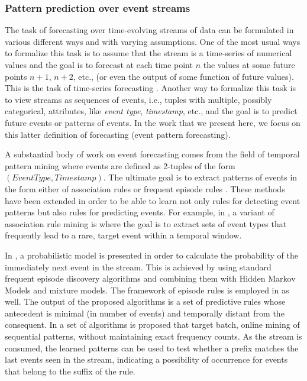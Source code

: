 

\subsubsection*{Pattern prediction over event streams}

\par The task of forecasting over time-evolving streams of data can be formulated in various different ways and with varying assumptions.
One of the most usual ways to formalize this task is to assume that the stream is a time-series of numerical values and the goal is to forecast at each time point $n$ the values at some future points $n+1$, $n+2$, etc., (or even the output of some function of future values). 
This is the task of time-series forecasting \cite{montgomery_introduction_2015}.
Another way to formalize this task is to view streams as sequences of events,
i.e., tuples with multiple, possibly categorical, attributes, like \textit{event type}, \textit{timestamp}, etc., and the goal is to predict future events or patterns of events.  In the work that we present here, we focus on this latter definition of forecasting (event pattern forecasting).  

\par A substantial body of work on event forecasting comes from the field of temporal pattern mining where events are defined as 2-tuples of the form $(\mathit{EventType},\mathit{Timestamp})$.
The ultimate goal is to extract patterns of events in the form either of association rules \cite{agrawal_mining_1993} or frequent episode rules \cite{mannila_discovery_1997}. 
These methods have been extended in order to be able to learn not only rules for detecting event patterns but also rules for predicting events.
For example, in \cite{vilalta_predicting_2002}, a variant of association rule mining is where the goal is to extract sets of event types that frequently lead to a rare, target event within a temporal window. 
\par In \cite{laxman_stream_2008}, a probabilistic model is presented
in order to calculate the probability of the immediately next event in the stream. 
This is achieved by using standard frequent episode discovery algorithms and combining them with Hidden Markov Models and mixture models.
The framework of episode rules is employed in \cite{fahed_efficient_2014} as well.
The output of the proposed algorithms is a set of predictive rules whose antecedent is minimal (in number of events) and temporally distant from the consequent.
In \cite{zhou_pattern_2015} a set of algorithms is proposed that target batch, online mining of sequential patterns, without maintaining exact frequency counts.
As the stream is consumed, the learned patterns can be used to test whether a prefix matches the last events seen in the stream, indicating a possibility of occurrence for events that belong to the suffix of the rule.

